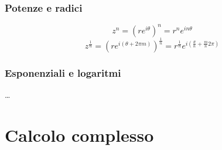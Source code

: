 \subsection{Potenze e radici}
\begin{equation}
  z^n = \left( r e^{i\theta} \right)^n = r^n e^{i n\theta}
\end{equation}
\begin{equation}
  z^{\frac{1}{n}} = \left( r e^{i(\theta + 2\pi m)} \right)^{\frac{1}{n}} = r^{\frac{1}{n}} e^{i\left(\frac{\theta}{n} + \frac{m}{n} 2 \pi \right)}
\end{equation}

\subsection{Esponenziali e logaritmi}
\dots

\chapter{Calcolo complesso}\label{ch:complex-calculus}
